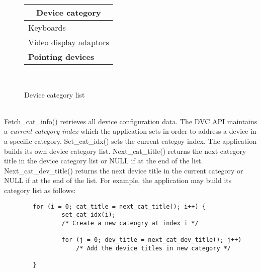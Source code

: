 \begin{figure}
\begin{center}
\begin{tabular}{@{}|l|@{}} \hline
\multicolumn{1}{|c|}{Device category} \\ \hline
Keyboards \\
Video display adaptors \\
{\bf Pointing devices} \\ \hline
\end{tabular}
 \\
\caption{Device category list}
\end{center}
\end{figure}

{\small \tt {}} \\

Fetch\_cat\_info() retrieves all device configuration data.  The DVC
API maintains a {\em current category index} which the application sets
in order to address a device in a specific category.
Set\_cat\_idx() sets the current categoy index.  The application builds
its own device category list.  Next\_cat\_title() returns the next
category title in the device category list or NULL if at the end of the
list.  Next\_cat\_dev\_title() returns the next device title in the
current category or NULL if at the end of the list.  For example, the
application may build its category list as follows:

{\small \begin{verbatim}
        for (i = 0; cat_title = next_cat_title(); i++) {
                set_cat_idx(i);
                /* Create a new cateogry at index i */

                for (j = 0; dev_title = next_cat_dev_title(); j++)
                    /* Add the device titles in new category */

        }
\end{verbatim}}

